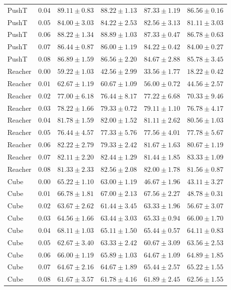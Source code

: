 \documentclass[10pt]{article}
\begin{document}
\begin{table}[H]
\begin{tabular}{llrrrr}
PushT & $0.04$ & $89.11 \pm 0.83$ & $88.22 \pm 1.13$ & $87.33 \pm 1.19$ & $86.56 \pm 0.16$ \\
PushT & $0.05$ & $84.00 \pm 3.03$ & $84.22 \pm 2.53$ & $82.56 \pm 3.13$ & $81.11 \pm 3.03$ \\
PushT & $0.06$ & $88.22 \pm 1.34$ & $88.89 \pm 1.03$ & $87.33 \pm 0.47$ & $86.78 \pm 0.63$ \\
PushT & $0.07$ & $86.44 \pm 0.87$ & $86.00 \pm 1.19$ & $84.22 \pm 0.42$ & $84.00 \pm 0.27$ \\
PushT & $0.08$ & $86.89 \pm 1.59$ & $86.56 \pm 2.20$ & $84.67 \pm 2.88$ & $85.78 \pm 3.45$ \\
\addlinespace[2pt]
Reacher & $0.00$ & $59.22 \pm 1.03$ & $42.56 \pm 2.99$ & $33.56 \pm 1.77$ & $18.22 \pm 0.42$ \\
Reacher & $0.01$ & $62.67 \pm 1.19$ & $60.67 \pm 1.09$ & $56.00 \pm 0.72$ & $44.56 \pm 2.57$ \\
Reacher & $0.02$ & $77.00 \pm 6.18$ & $76.44 \pm 8.17$ & $77.22 \pm 6.68$ & $70.33 \pm 9.46$ \\
Reacher & $0.03$ & $78.22 \pm 1.66$ & $79.33 \pm 0.72$ & $79.11 \pm 1.10$ & $76.78 \pm 4.17$ \\
Reacher & $0.04$ & $81.78 \pm 1.59$ & $82.00 \pm 1.52$ & $81.11 \pm 2.62$ & $80.56 \pm 1.03$ \\
Reacher & $0.05$ & $76.44 \pm 4.57$ & $77.33 \pm 5.76$ & $77.56 \pm 4.01$ & $77.78 \pm 5.67$ \\
Reacher & $0.06$ & $82.22 \pm 2.79$ & $79.33 \pm 2.42$ & $81.67 \pm 1.63$ & $80.67 \pm 1.19$ \\
Reacher & $0.07$ & $82.11 \pm 2.20$ & $82.44 \pm 1.29$ & $81.44 \pm 1.85$ & $83.33 \pm 1.09$ \\
Reacher & $0.08$ & $81.33 \pm 2.33$ & $82.56 \pm 2.08$ & $82.00 \pm 1.78$ & $81.56 \pm 0.87$ \\
\addlinespace[2pt]
Cube & $0.00$ & $65.22 \pm 1.10$ & $63.00 \pm 1.19$ & $46.67 \pm 1.96$ & $43.11 \pm 3.27$ \\
Cube & $0.01$ & $66.78 \pm 1.81$ & $67.00 \pm 2.13$ & $67.56 \pm 2.27$ & $48.78 \pm 0.31$ \\
Cube & $0.02$ & $63.67 \pm 2.62$ & $61.44 \pm 3.45$ & $63.33 \pm 1.96$ & $56.67 \pm 3.07$ \\
Cube & $0.03$ & $64.56 \pm 1.66$ & $63.44 \pm 3.03$ & $65.33 \pm 0.94$ & $66.00 \pm 1.70$ \\
Cube & $0.04$ & $68.11 \pm 1.03$ & $65.11 \pm 1.50$ & $65.44 \pm 0.57$ & $64.11 \pm 0.83$ \\
Cube & $0.05$ & $62.67 \pm 3.40$ & $63.33 \pm 2.42$ & $60.67 \pm 3.09$ & $63.56 \pm 2.53$ \\
Cube & $0.06$ & $66.00 \pm 1.19$ & $65.89 \pm 1.03$ & $64.67 \pm 1.09$ & $64.89 \pm 1.85$ \\
Cube & $0.07$ & $64.67 \pm 2.16$ & $64.67 \pm 1.89$ & $65.44 \pm 2.57$ & $65.22 \pm 1.55$ \\
Cube & $0.08$ & $61.67 \pm 3.57$ & $61.78 \pm 4.16$ & $61.89 \pm 2.45$ & $62.56 \pm 1.55$ \\
\bottomrule
\end{tabular}
\end{table}
\end{document}
